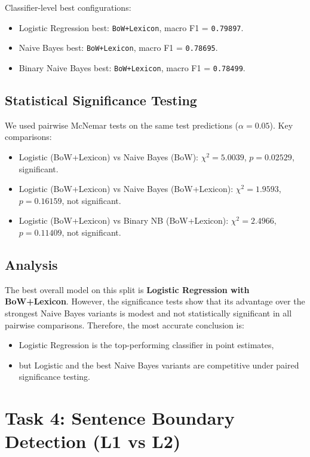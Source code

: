 \documentclass[10pt,a4paper]{article}
\begin{document}
Classifier-level best configurations:
\begin{itemize}
    \item Logistic Regression best: \texttt{BoW+Lexicon}, macro F1 = \texttt{0.79897}.
    \item Naive Bayes best: \texttt{BoW+Lexicon}, macro F1 = \texttt{0.78695}.
    \item Binary Naive Bayes best: \texttt{BoW+Lexicon}, macro F1 = \texttt{0.78499}.
\end{itemize}

\subsection{Statistical Significance Testing}
We used pairwise McNemar tests on the same test predictions (\(\alpha=0.05\)). Key comparisons:
\begin{itemize}
    \item Logistic (BoW+Lexicon) vs Naive Bayes (BoW): \(\chi^2=5.0039\), \(p=0.02529\), significant.
    \item Logistic (BoW+Lexicon) vs Naive Bayes (BoW+Lexicon): \(\chi^2=1.9593\), \(p=0.16159\), not significant.
    \item Logistic (BoW+Lexicon) vs Binary NB (BoW+Lexicon): \(\chi^2=2.4966\), \(p=0.11409\), not significant.
\end{itemize}

\subsection{Analysis}
The best overall model on this split is \textbf{Logistic Regression with BoW+Lexicon}.
However, the significance tests show that its advantage over the strongest Naive Bayes variants is modest and not statistically significant in all pairwise comparisons. Therefore, the most accurate conclusion is:
\begin{itemize}
    \item Logistic Regression is the top-performing classifier in point estimates,
    \item but Logistic and the best Naive Bayes variants are competitive under paired significance testing.
\end{itemize}

\section{Task 4: Sentence Boundary Detection (L1 vs L2)}
\end{document}
